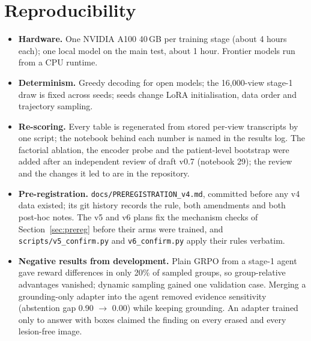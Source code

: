 \documentclass[11pt]{article}
\begin{document}
\section{Reproducibility}\label{app:repro}
\begin{itemize}[leftmargin=*,nosep]
\item \textbf{Hardware.} One NVIDIA A100 40\,GB per training stage (about 4 hours each); one local model on the main test, about 1 hour. Frontier models run from a CPU runtime.
\item \textbf{Determinism.} Greedy decoding for open models; the 16,000-view stage-1 draw is fixed across seeds; seeds change LoRA initialisation, data order and trajectory sampling.
\item \textbf{Re-scoring.} Every table is regenerated from stored per-view transcripts by one script; the notebook behind each number is named in the results log. The factorial ablation, the encoder probe and the patient-level bootstrap were added after an independent review of draft v0.7 (notebook 29); the review and the changes it led to are in the repository.
\item \textbf{Pre-registration.} \texttt{docs/PREREGISTRATION\_v4.md}, committed before any v4 data existed; its git history records the rule, both amendments and both post-hoc notes. The v5 and v6 plans fix the mechanism checks of Section~\ref{sec:prereg} before their arms were trained, and \texttt{scripts/v5\_confirm.py} and \texttt{v6\_confirm.py} apply their rules verbatim.
\item \textbf{Negative results from development.} Plain GRPO from a stage-1 agent gave reward differences in only 20\% of sampled groups, so group-relative advantages vanished; dynamic sampling gained one validation case. Merging a grounding-only adapter into the agent removed evidence sensitivity (abstention gap 0.90 $\to$ 0.00) while keeping grounding. An adapter trained only to answer with boxes claimed the finding on every erased and every lesion-free image.
\end{itemize}
\end{document}
